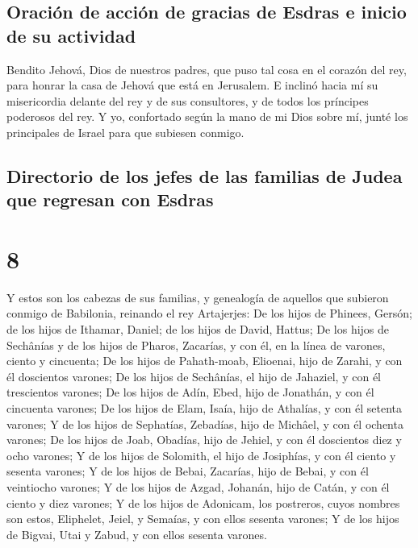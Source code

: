 \hypertarget{oraciuxf3n-de-acciuxf3n-de-gracias-de-esdras-e-inicio-de-su-actividad}{%
\subsection{Oración de acción de gracias de Esdras e inicio de su
actividad}\label{oraciuxf3n-de-acciuxf3n-de-gracias-de-esdras-e-inicio-de-su-actividad}}

 Bendito Jehová, Dios de nuestros padres, que puso tal cosa
en el corazón del rey, para honrar la casa de Jehová que está en
Jerusalem.  E inclinó hacia mí su misericordia delante del
rey y de sus consultores, y de todos los príncipes poderosos del rey. Y
yo, confortado según la mano de mi Dios sobre mí, junté los principales
de Israel para que subiesen conmigo.

\hypertarget{directorio-de-los-jefes-de-las-familias-de-judea-que-regresan-con-esdras}{%
\subsection{Directorio de los jefes de las familias de Judea que
regresan con
Esdras}\label{directorio-de-los-jefes-de-las-familias-de-judea-que-regresan-con-esdras}}

\hypertarget{section-7}{%
\section{8}\label{section-7}}

 Y estos son los cabezas de sus familias, y genealogía de
aquellos que subieron conmigo de Babilonia, reinando el rey Artajerjes:
 De los hijos de Phinees, Gersón; de los hijos de Ithamar,
Daniel; de los hijos de David, Hattus;  De los hijos de
Sechânías y de los hijos de Pharos, Zacarías, y con él, en la línea de
varones, ciento y cincuenta;  De los hijos de Pahath-moab,
Elioenai, hijo de Zarahi, y con él doscientos varones;  De
los hijos de Sechânías, el hijo de Jahaziel, y con él trescientos
varones;  De los hijos de Adín, Ebed, hijo de Jonathán, y
con él cincuenta varones;  De los hijos de Elam, Isaía, hijo
de Athalías, y con él setenta varones;  Y de los hijos de
Sephatías, Zebadías, hijo de Michâel, y con él ochenta varones;
 De los hijos de Joab, Obadías, hijo de Jehiel, y con él
doscientos diez y ocho varones;  Y de los hijos de
Solomith, el hijo de Josiphías, y con él ciento y sesenta varones;
 Y de los hijos de Bebai, Zacarías, hijo de Bebai, y con él
veintiocho varones;  Y de los hijos de Azgad, Johanán, hijo
de Catán, y con él ciento y diez varones;  Y de los hijos
de Adonicam, los postreros, cuyos nombres son estos, Eliphelet, Jeiel, y
Semaías, y con ellos sesenta varones;  Y de los hijos de
Bigvai, Utai y Zabud, y con ellos sesenta varones.

